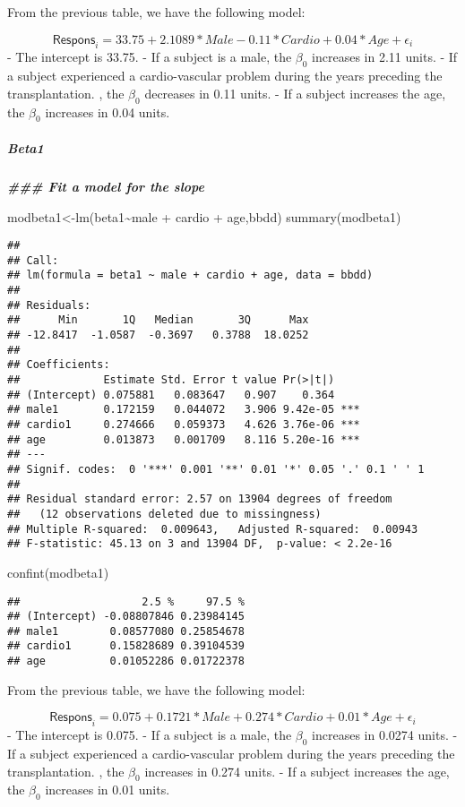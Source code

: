 \documentclass[
]{article}
\newenvironment{Shaded}{\begin{snugshade}}{\end{snugshade}}
\newcommand{\DocumentationTok}[1]{\textcolor[rgb]{0.56,0.35,0.01}{\textbf{\textit{#1}}}}
\newcommand{\FunctionTok}[1]{\textcolor[rgb]{0.00,0.00,0.00}{#1}}
\newcommand{\NormalTok}[1]{#1}
\newcommand{\OtherTok}[1]{\textcolor[rgb]{0.56,0.35,0.01}{#1}}
\newcommand{\SpecialCharTok}[1]{\textcolor[rgb]{0.00,0.00,0.00}{#1}}
\begin{document}
From the previous table, we have the following model:

\[\textsf{Respons}_i = 33.75 + 2.1089 * Male- 0.11 * Cardio + 0.04 * Age + \epsilon_i\]
- The intercept is 33.75. - If a subject is a male, the \(\beta_{0}\)
increases in 2.11 units. - If a subject experienced a cardio-vascular
problem during the years preceding the transplantation. , the
\(\beta_{0}\) decreases in 0.11 units. - If a subject increases the age,
the \(\beta_{0}\) increases in 0.04 units.

\hypertarget{beta1}{%
\subparagraph{Beta1}\label{beta1}}

\begin{Shaded}
\begin{Highlighting}[]
\DocumentationTok{\#\#\# Fit a model for the slope}

\NormalTok{modbeta1}\OtherTok{\textless{}{-}}\FunctionTok{lm}\NormalTok{(beta1}\SpecialCharTok{\textasciitilde{}}\NormalTok{male }\SpecialCharTok{+}\NormalTok{ cardio }\SpecialCharTok{+}\NormalTok{ age,bbdd)}
\FunctionTok{summary}\NormalTok{(modbeta1)}
\end{Highlighting}
\end{Shaded}

\begin{verbatim}
## 
## Call:
## lm(formula = beta1 ~ male + cardio + age, data = bbdd)
## 
## Residuals:
##      Min       1Q   Median       3Q      Max 
## -12.8417  -1.0587  -0.3697   0.3788  18.0252 
## 
## Coefficients:
##             Estimate Std. Error t value Pr(>|t|)    
## (Intercept) 0.075881   0.083647   0.907    0.364    
## male1       0.172159   0.044072   3.906 9.42e-05 ***
## cardio1     0.274666   0.059373   4.626 3.76e-06 ***
## age         0.013873   0.001709   8.116 5.20e-16 ***
## ---
## Signif. codes:  0 '***' 0.001 '**' 0.01 '*' 0.05 '.' 0.1 ' ' 1
## 
## Residual standard error: 2.57 on 13904 degrees of freedom
##   (12 observations deleted due to missingness)
## Multiple R-squared:  0.009643,   Adjusted R-squared:  0.00943 
## F-statistic: 45.13 on 3 and 13904 DF,  p-value: < 2.2e-16
\end{verbatim}

\begin{Shaded}
\begin{Highlighting}[]
\FunctionTok{confint}\NormalTok{(modbeta1)}
\end{Highlighting}
\end{Shaded}

\begin{verbatim}
##                   2.5 %     97.5 %
## (Intercept) -0.08807846 0.23984145
## male1        0.08577080 0.25854678
## cardio1      0.15828689 0.39104539
## age          0.01052286 0.01722378
\end{verbatim}

From the previous table, we have the following model:

\[\textsf{Respons}_i = 0.075 + 0.1721 * Male + 0.274 * Cardio + 0.01 * Age + \epsilon_i\]
- The intercept is 0.075. - If a subject is a male, the \(\beta_{0}\)
increases in 0.0274 units. - If a subject experienced a cardio-vascular
problem during the years preceding the transplantation. , the
\(\beta_{0}\) increases in 0.274 units. - If a subject increases the
age, the \(\beta_{0}\) increases in 0.01 units.
\end{document}
